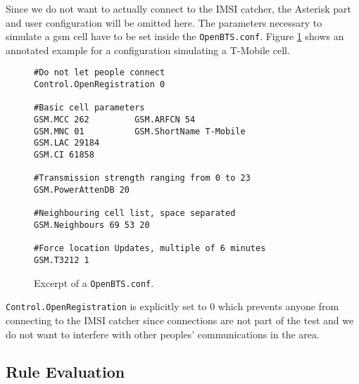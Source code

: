 Since we do not want to actually connect to the IMSI catcher, the Asterisk part and user configuration will be omitted here.
The parameters necessary to simulate a \gls{gsm} cell have to be set inside the \texttt{OpenBTS.conf}.
Figure \ref{fig:openbts_parameters} shows an annotated example for a configuration simulating a T-Mobile cell.
\begin{figure}
\begin{lstlisting}
#Do not let people connect
Control.OpenRegistration 0

#Basic cell parameters
GSM.MCC 262			GSM.ARFCN 54
GSM.MNC 01			GSM.ShortName T-Mobile
GSM.LAC 29184		
GSM.CI 61858
	
#Transmission strength ranging from 0 to 23
GSM.PowerAttenDB 20

#Neighbouring cell list, space separated
GSM.Neighbours 69 53 20

#Force location Updates, multiple of 6 minutes
GSM.T3212 1
\end{lstlisting}
\caption{Excerpt of a \texttt{OpenBTS.conf}.}
\label{fig:openbts_parameters}
\end{figure}
\texttt{Control.OpenRegistration} is explicitly set to 0 which prevents anyone from connecting to the IMSI catcher since connections are not part of the test and we do not want to interfere with other peoples' communications in the area.


\subsection{Rule Evaluation}


